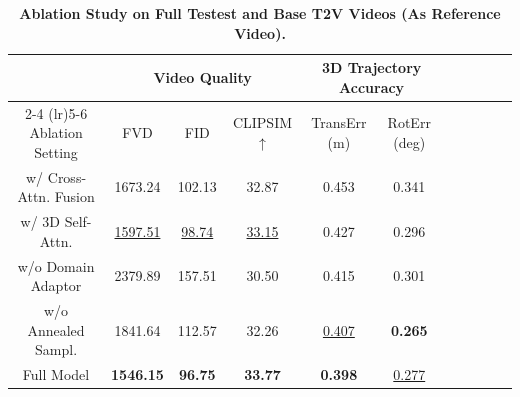 \begin{table}[!ht]

\vspace{-1em}
\caption{\textbf{Ablation Study on Full Testest and Base T2V Videos (As Reference Video).} } 
\label{tab:ablation_main}

\centering
\begin{threeparttable}
\resizebox{.88\textwidth}{!} 
{
\begin{tabular}{ccccccccccc}
\toprule
&  \multicolumn{3}{c}{ Video Quality } & \multicolumn{2}{c}{ 3D Trajectory Accuracy } \\
\cmidrule(lr){2-4} 
\cmidrule(lr){5-6} 
Ablation Setting & FVD  & FID  & CLIPSIM $\uparrow$  &  TransErr (m)  & RotErr (deg)   \\

\midrule

w/ Cross-Attn. Fusion & 1673.24 & 102.13 & 32.87 & 0.453 & 0.341 \\
w/ 3D Self-Attn. & \underline{1597.51} & \underline{98.74} & \underline{33.15} & 0.427 & 0.296 \\
w/o Domain Adaptor & 2379.89 & 157.51 & 30.50 & 0.415 & 0.301 \\
w/o Annealed Sampl. & 1841.64 & 112.57 & 32.26 & \underline{0.407} & \textbf{0.265} \\
\midrule
Full Model & \textbf{1546.15} & \textbf{96.75} & \textbf{33.77} & \textbf{0.398} & \underline{0.277} \\

\bottomrule
\end{tabular}
}
\vspace{-1em}
\end{threeparttable}
\end{table}
